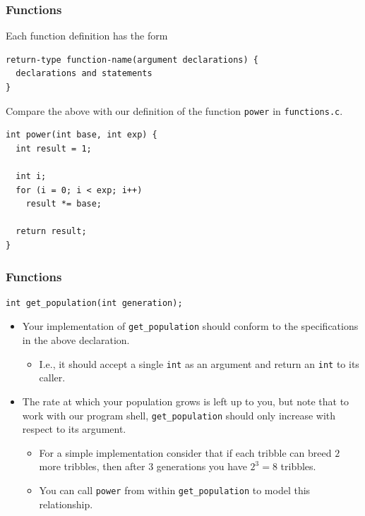 \documentclass[pdf]{beamer}
\begin{document}
\begin{frame}[fragile]
  \frametitle{Functions}

  Each function definition has the form
  \bigskip

\begin{verbatim}
return-type function-name(argument declarations) {
  declarations and statements
}
\end{verbatim}

  \pause

  \bigskip

  Compare the above with our definition of the function \texttt{power} in
  \texttt{functions.c}. \pause

  \bigskip

\begin{verbatim}
int power(int base, int exp) {
  int result = 1;

  int i;
  for (i = 0; i < exp; i++)
    result *= base;

  return result;
}
\end{verbatim}

\end{frame}

\begin{frame}[fragile]
  \frametitle{Functions}

\begin{verbatim}
int get_population(int generation);
\end{verbatim}

  \bigskip

  \begin{itemize}
  \item Your implementation of \texttt{get_population} should conform to
    the specifications in the above declaration. \pause
    \begin{itemize}
    \item I.e., it should accept a single \texttt{int} as an argument and
      return an \texttt{int} to its caller. \pause
    \end{itemize}
  \item The rate at which your population grows is left up to you, but note that to
    work with our program shell, \texttt{get_population} should only
    increase with respect to its argument. \pause
    \begin{itemize}
    \item For a simple implementation consider that if each tribble can breed
      $2$ more tribbles, then after $3$ generations you have $2^3 = 8$ tribbles.
      \pause
    \item You can call \texttt{power} from within
      \texttt{get_population} to model this relationship.
    \end{itemize}
  \end{itemize}

\end{frame}
\end{document}

